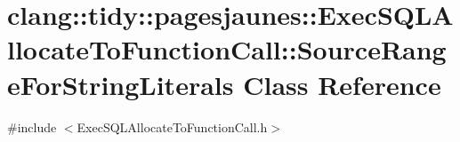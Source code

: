 \hypertarget{classclang_1_1tidy_1_1pagesjaunes_1_1_exec_s_q_l_allocate_to_function_call_1_1_source_range_for_string_literals}{}\section{clang\+:\+:tidy\+:\+:pagesjaunes\+:\+:Exec\+S\+Q\+L\+Allocate\+To\+Function\+Call\+:\+:Source\+Range\+For\+String\+Literals Class Reference}
\label{classclang_1_1tidy_1_1pagesjaunes_1_1_exec_s_q_l_allocate_to_function_call_1_1_source_range_for_string_literals}


{\ttfamily \#include $<$Exec\+S\+Q\+L\+Allocate\+To\+Function\+Call.\+h$>$}


